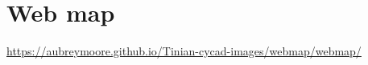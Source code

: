 \documentclass[12pt,letterpaper,english,bibliography=totocnumbered, abstract=on]{scrartcl}
\begin{document}
\section{Web map}

\url{https://aubreymoore.github.io/Tinian-cycad-images/webmap/webmap/}

%
%
%	
%	
%
\end{document}
